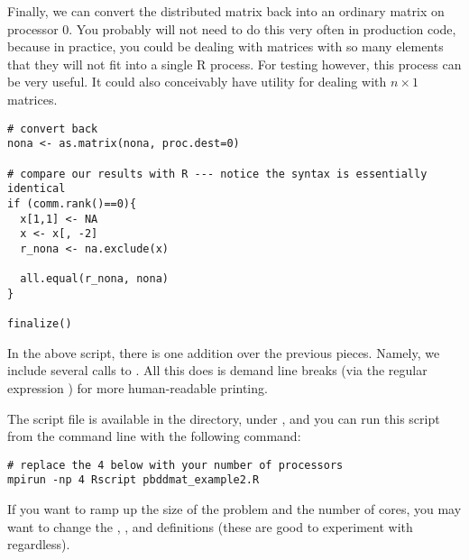 Finally, we can convert the distributed matrix back into an ordinary  matrix on processor 0.  You probably will not need to do this very often in production code, because in practice, you could be dealing with matrices with so many elements that they will not fit into a single R process.  For testing however, this process can be very useful.  It could also conceivably have utility for dealing with $n\times 1$ matrices.

\begin{lstlisting}[language=rr,title=Insertion and Extraction]
# convert back
nona <- as.matrix(nona, proc.dest=0)

# compare our results with R --- notice the syntax is essentially identical
if (comm.rank()==0){
  x[1,1] <- NA
  x <- x[, -2]
  r_nona <- na.exclude(x)
  
  all.equal(r_nona, nona)
}

finalize()
\end{lstlisting}


In the above script, there is one addition over the previous pieces.  Namely, we include several calls to .  All this does is demand line breaks (via the regular expression ) for more human-readable printing.

The script file is available in the  directory, under , and you can run this script from the command line with the following command:

\begin{lstlisting}
# replace the 4 below with your number of processors
mpirun -np 4 Rscript pbddmat_example2.R
\end{lstlisting}

If you want to ramp up the size of the problem and the number of cores, you may want to change the , , and  definitions (these are good to experiment with regardless). 
